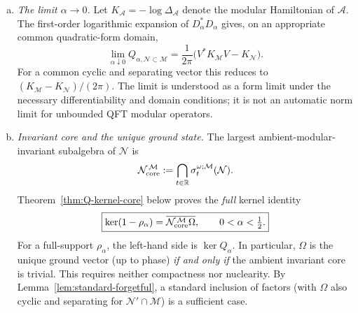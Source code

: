 \documentclass[a4paper,11pt]{article}
\theoremstyle{definition}
\newcommand{\mA}{\mathcal{A}}
\newcommand{\mN}{\mathcal{N}}
\newcommand{\mM}{\mathcal{M}}
\begin{document}
\begin{enumerate}[(a)]
\item \emph{The limit $\alpha\to0$.}
Let $K_\mA=-\log\Delta_\mA$ denote the modular Hamiltonian of
$\mA$. The first-order logarithmic expansion of $D_\alpha^*D_\alpha$
gives, on an appropriate common quadratic-form domain,
\begin{equation}
    \boxed{
    \lim_{\alpha\downarrow0}Q_{\alpha,\mN\subset\mM}
    =\frac1{2\pi}
    \bigl(V^*K_\mM V-K_\mN\bigr).
    }
    \label{eq:Q-alpha-zero}
\end{equation}
For a common cyclic and separating vector this reduces to
$(K_\mM-K_\mN)/(2\pi)$. The limit is understood as a form limit
under the necessary differentiability and domain conditions; it is
not an automatic norm limit for unbounded QFT modular operators.

\item \emph{Invariant core and the unique ground state.}
The largest ambient-modular-invariant subalgebra of $\mN$ is
\begin{equation}
    \mN_{\rm core}^{\,\mM}
    :=\bigcap_{t\in\mathbb R}\sigma_t^{\omega;\mM}(\mN).
    \label{eq:Q-core-property}
\end{equation}
Theorem~\ref{thm:Q-kernel-core} below proves the \emph{full} kernel identity
\begin{equation}
    \boxed{\ker(1-\rho_\alpha)
    =\overline{\mN_{\rm core}^{\,\mM}\Omega},
    \qquad 0<\alpha<\tfrac12.}
    \label{eq:Q-full-kernel}
\end{equation}
For a full-support $\rho_\alpha$, the left-hand side is
$\ker Q_\alpha$. In particular, $\Omega$ is the unique ground vector
(up to phase) \emph{if and only if} the ambient invariant core is trivial.
This requires neither compactness nor nuclearity. By
Lemma~\ref{lem:standard-forgetful}, a standard inclusion of factors
(with $\Omega$ also cyclic and separating for $\mN'\cap\mM$)
is a sufficient case.


\end{enumerate}
\end{document}
